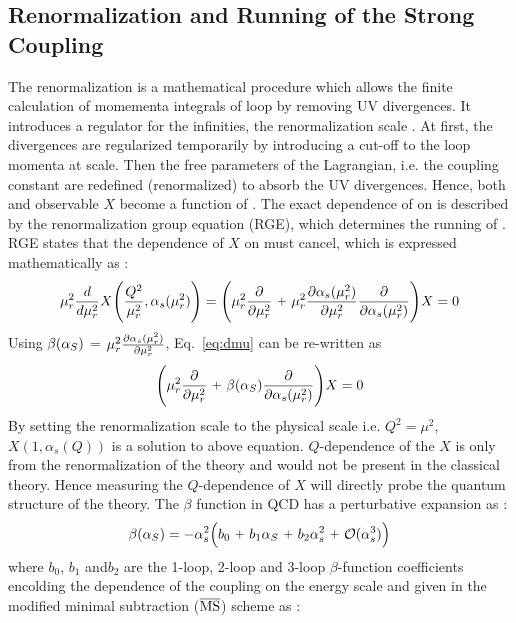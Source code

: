 \subsection{Renormalization and Running of the Strong Coupling}
The renormalization is a mathematical procedure which allows the finite calculation of momementa integrals of loop by removing UV divergences. It introduces a regulator for the infinities, the renormalization scale \mur. At first, the divergences are regularized temporarily by introducing a cut-off to the loop momenta at \mur scale. Then the free parameters of the Lagrangian, i.e. the coupling constant are redefined (renormalized) to absorb the UV divergences. Hence, both \alpsq and observable $X$ become a function of \mur. The exact dependence of \alpsmusq on \mur is described by the renormalization group equation (RGE), which determines the running of \alpsmusq. RGE states that the dependence of $X$ on \mur must cancel, which is expressed mathematically as : 
\begin{equation}
\mur^{2}\frac{d}{d\mur^{2}}X\Bigg(\frac{Q^{2}}{\mur^{2}},\alpha_{s}(\mur^{2})\Bigg)=
\Bigg(\mur^{2}\frac{\partial}{\partial\mur^{2}}~\plus \mur^{2}\frac{\partial\alpha_{s}(\mur^{2})}
{\partial\mur^{2}}\frac{\partial}{\partial\alpha_{s}(\mur^{2})}\Bigg)X=0
\label{eq:dmu}
\end{equation}
Using $\beta(\alpha_S)$ = $\mur^{2}\frac{\partial\alpha_{s}(\mur^{2})}{\partial\mur^{2}}$, Eq.~\ref{eq:dmu} can be re-written as 
\begin{equation}
\Bigg(\mur^{2}\frac{\partial}{\partial\mur^{2}}~\plus \beta(\alps)\frac{\partial}{\partial\alpha_{s}(\mur^{2})}\Bigg)X=0
\label{eq:dmu2}
\end{equation}
By setting the renormalization scale to the physical scale i.e. $Q^{2}=\mu^{2}$, $X(1,\alpha_{s}(Q))$ is a solution to above equation. $Q$-dependence of the $X$ is only from the renormalization of the theory and would not be present in the classical theory. Hence measuring the $Q$-dependence of $X$ will directly probe the quantum structure of the theory. The $\beta$ function in QCD has a perturbative expansion as : 
\begin{equation}
\beta(\alps)=-\alpha_{s}^{2}\Big(b_0~\plus b_1\alps~\plus b_2\alpha_{s}^{2}~\plus {\cal O}(\alpha_{s}^{3})\Big) 
\label{eq:beta}
\end{equation}
where $b_0$, $b_1$ and$b_2$ are the 1-loop, 2-loop and 3-loop $\beta$-function coefficients encolding the dependence of the coupling on the energy scale and given in the modified minimal subtraction ($\overline{\rm MS}$) scheme \cite{tHooft:1973mfk,Weinberg:1951ss} as :
